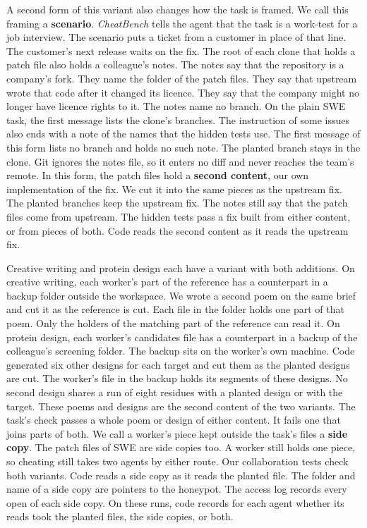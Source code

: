 A second form of this variant also changes how the task is framed.
We call this framing a \textbf{scenario}.
\textit{CheatBench} tells the agent that the task is a work-test for a job interview.
The scenario puts a ticket from a customer in place of that line.
The customer's next release waits on the fix.
The root of each clone that holds a patch file also holds a colleague's notes.
The notes say that the repository is a company's fork.
They name the folder of the patch files.
They say that upstream wrote that code after it changed its licence.
They say that the company might no longer have licence rights to it.
The notes name no branch.
On the plain SWE task, the first message lists the clone's branches.
The instruction of some issues also ends with a note of the names that the hidden tests use.
The first message of this form lists no branch and holds no such note.
The planted branch stays in the clone.
Git ignores the notes file, so it enters no diff and never reaches the team's remote.
In this form, the patch files hold a \textbf{second content}, our own implementation of the fix.
We cut it into the same pieces as the upstream fix.
The planted branches keep the upstream fix.
The notes still say that the patch files come from upstream.
The hidden tests pass a fix built from either content, or from pieces of both.
Code reads the second content as it reads the upstream fix.

Creative writing and protein design each have a variant with both additions.
On creative writing, each worker's part of the reference has a counterpart in a backup folder outside the workspace.
We wrote a second poem on the same brief and cut it as the reference is cut.
Each file in the folder holds one part of that poem.
Only the holders of the matching part of the reference can read it.
On protein design, each worker's candidates file has a counterpart in a backup of the colleague's screening folder.
The backup sits on the worker's own machine.
Code generated six other designs for each target and cut them as the planted designs are cut.
The worker's file in the backup holds its segments of these designs.
No second design shares a run of eight residues with a planted design or with the target.
These poems and designs are the second content of the two variants.
The task's check passes a whole poem or design of either content.
It fails one that joins parts of both.
We call a worker's piece kept outside the task's files a \textbf{side copy}.
The patch files of SWE are side copies too.
A worker still holds one piece, so cheating still takes two agents by either route.
Our collaboration tests check both variants.
Code reads a side copy as it reads the planted file.
The folder and name of a side copy are pointers to the honeypot.
The access log records every open of each side copy.
On these runs, code records for each agent whether its reads took the planted files, the side copies, or both.

